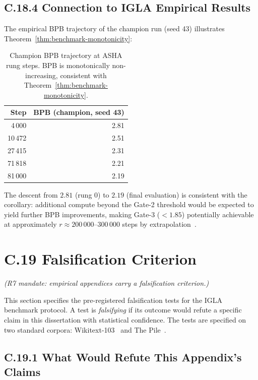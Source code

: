 \subsection*{C.18.4 Connection to IGLA Empirical Results}

The empirical BPB trajectory of the champion run (seed 43) illustrates
Theorem~\ref{thm:benchmark-monotonicity}:

\begin{table}[h]
\centering
\begin{tabular}{rr}
\toprule
\textbf{Step} & \textbf{BPB (champion, seed 43)} \\
\midrule
 4\,000 & 2.81 \\
10\,472 & 2.51 \\
27\,415 & 2.31 \\
71\,818 & 2.21 \\
81\,000 & 2.19 \\
\bottomrule
\end{tabular}
\caption{Champion BPB trajectory at ASHA rung steps.  BPB is
monotonically non-increasing, consistent with
Theorem~\ref{thm:benchmark-monotonicity}.}
\end{table}

The descent from $2.81$ (rung 0) to $2.19$ (final evaluation) is
consistent with the corollary: additional compute beyond the Gate-2
threshold would be expected to yield further BPB improvements, making
Gate-3 ($< 1.85$) potentially achievable at approximately
$r \approx 200\,000$--$300\,000$ steps by
extrapolation~\cite{hoffmann2022chinchilla}.

\section*{C.19 Falsification Criterion}
\label{sec:falsification-criterion}

\emph{(R7 mandate: empirical appendices carry a falsification
criterion.)}

This section specifies the pre-registered falsification tests for the
IGLA benchmark protocol.  A test is \emph{falsifying} if its outcome
would refute a specific claim in this dissertation with statistical
confidence.  The tests are specified on two standard corpora:
Wikitext-103~\cite{merity2017pointer} and The Pile~\cite{gao2020pile}.

\subsection*{C.19.1 What Would Refute This Appendix's Claims}

